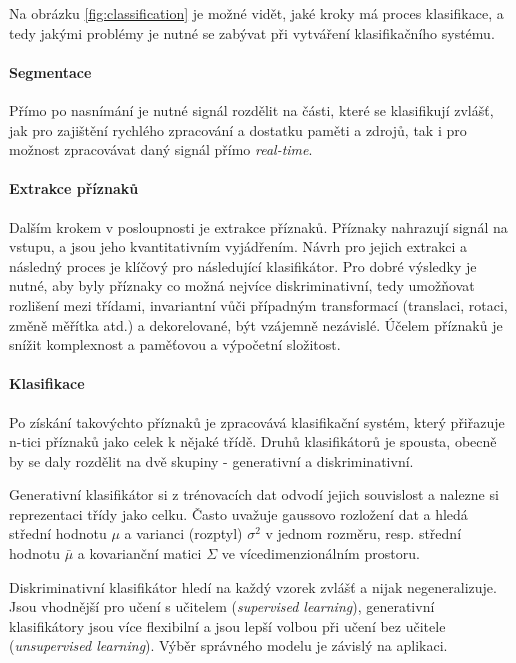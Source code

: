 \documentclass[10pt,a4paper]{article}
\begin{document}
  Na obrázku \ref{fig:classification} je možné vidět, jaké kroky má proces klasifikace, a tedy
  jakými problémy je nutné se zabývat při vytváření klasifikačního systému.
  
  \paragraph{Segmentace}
  Přímo po nasnímání je nutné signál rozdělit na části, které se klasifikují zvlášť, jak pro
  zajištění rychlého zpracování a dostatku paměti a zdrojů, tak i pro možnost zpracovávat
  daný signál přímo {\it real-time}.

  \paragraph{Extrakce příznaků}
  Dalším krokem v posloupnosti je extrakce příznaků. Příznaky nahrazují signál na vstupu,
  a jsou jeho kvantitativním vyjádřením. Návrh pro jejich extrakci a následný proces je klíčový
  pro následující klasifikátor. Pro dobré výsledky je nutné, aby byly příznaky co možná nejvíce
  diskriminativní, tedy umožňovat rozlišení mezi třídami, invariantní vůči případným transformací
  (translaci, rotaci, změně měřítka atd.) a dekorelované, být vzájemně nezávislé. Účelem příznaků
  je snížit komplexnost a paměťovou a výpočetní složitost.

  \paragraph{Klasifikace}
  Po získání takovýchto příznaků je zpracovává klasifikační systém, který přiřazuje n-tici příznaků
  jako celek k nějaké třídě. Druhů klasifikátorů je spousta, obecně by se daly rozdělit na dvě
  skupiny - generativní a diskriminativní.
  
  Generativní klasifikátor si z trénovacích dat odvodí jejich souvislost a nalezne si reprezentaci
  třídy jako celku. Často uvažuje gaussovo rozložení dat a hledá střední hodnotu $\mu$ a varianci (rozptyl)
  $\sigma^2$ v jednom rozměru, resp. střední hodnotu $\bar{\mu}$ a kovarianční matici $\Sigma$ ve
  vícedimenzionálním prostoru.
  
  Diskriminativní klasifikátor hledí na každý vzorek zvlášť a nijak negeneralizuje. Jsou vhodnější
  pro učení s učitelem ({\it supervised learning}), generativní klasifikátory jsou více flexibilní
  a jsou lepší volbou při učení bez učitele ({\it unsupervised learning}). Výběr správného
  modelu je závislý na aplikaci.
\end{document}
